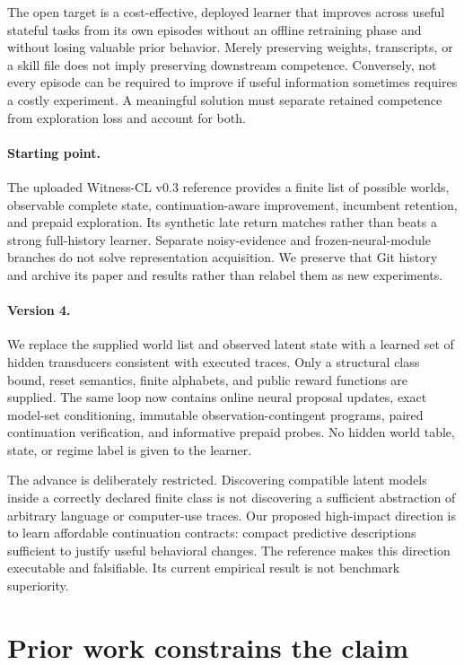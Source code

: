 \documentclass[10pt,twocolumn]{article}
\begin{document}
The open target is a cost-effective, deployed learner that improves across useful
stateful tasks from its own episodes without an offline retraining phase and
without losing valuable prior behavior. Merely preserving weights, transcripts,
or a skill file does not imply preserving downstream competence. Conversely,
not every episode can be required to improve if useful information sometimes
requires a costly experiment. A meaningful solution must separate retained
competence from exploration loss and account for both.

\paragraph{Starting point.}
The uploaded Witness-CL v0.3 reference provides a finite list of possible worlds,
observable complete state, continuation-aware improvement, incumbent retention,
and prepaid exploration. Its synthetic late return matches rather than beats a
strong full-history learner. Separate noisy-evidence and frozen-neural-module
branches do not solve representation acquisition. We preserve that Git history
and archive its paper and results rather than relabel them as new experiments.

\paragraph{Version 4.}
We replace the supplied world list and observed latent state with a learned set of
hidden transducers consistent with executed traces. Only a structural class
bound, reset semantics, finite alphabets, and public reward functions are supplied.
The same loop now contains online neural proposal updates, exact model-set
conditioning, immutable observation-contingent programs, paired continuation
verification, and informative prepaid probes. No hidden world table, state, or
regime label is given to the learner.

The advance is deliberately restricted. Discovering compatible latent models
inside a correctly declared finite class is not discovering a sufficient
abstraction of arbitrary language or computer-use traces. Our proposed
high-impact direction is to learn affordable continuation contracts: compact
predictive descriptions sufficient to justify useful behavioral changes. The
reference makes this direction executable and falsifiable. Its current empirical
result is not benchmark superiority.

\section{Prior work constrains the claim}
\end{document}
